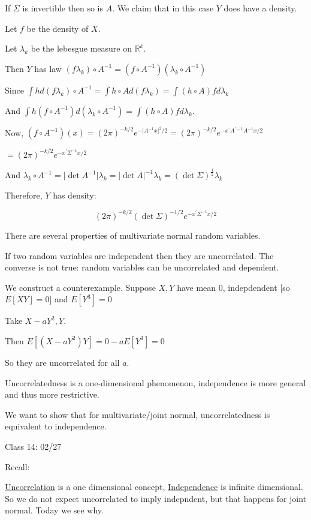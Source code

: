 \documentclass{article}
\theoremstyle{definition}
\begin{document}
If \(\Sigma\) is invertible then so is \(A\). We claim that in this case \(Y\) does have a density.

Let \(f\) be the density of \(X\).

Let \(\lambda_k\) be the lebesgue measure on \(\mathbb{R}^k\).

Then \(Y\) has law \((f \lambda_k)\circ A^{-1} = (f\circ A ^{-1} )(\lambda_k\circ A ^{-1})\) 

Since \(\int h d(f \lambda_k)\circ A ^{-1} = \int h\circ A d(f \lambda _k) = \int (h\circ A)f d \lambda _k\) 

And \(\int h(f\circ A ^{-1} )d(\lambda_k \circ A ^{-1} ) = \int (h\circ A)f d \lambda_k\).

Now, \((f\circ A ^{-1} )(x) = (2 \pi )^{- k / 2}e^{-\vert A ^{-1} x \vert ^2 / 2} = (2\pi )^{- k / 2}e^{- x^{\prime} A^{\prime-1} A ^{-1}  x / 2}\) 

\(= (2\pi )^{-k / 2}e^{- x^{\prime} \Sigma ^{-1} x / 2}\) 

And \(\lambda_k \circ A ^{-1} = \vert \det A ^{-1} \vert  \lambda _k = \vert \det A \vert ^{-1} \lambda_k = (\det \Sigma)^{\frac{1}{2}} \lambda_k\) 

Therefore, \(Y\) has density:

\[
    (2\pi)^{-k / 2}(\det \Sigma)^{-1 / 2}e^{-x^{\prime} \Sigma ^{-1} x / 2}
\]

There are several properties of multivariate normal random variables.

If two random variables are independent then they are uncorrelated. The converse is not true: random variables can be uncorrelated and dependent.

We construct a counterexample. Suppose \(X,Y\) have mean \(0\), indepdendent [so \(E[XY] = 0\)] and \(E[Y^3] = 0\)  

Take \(X - aY^2, Y\). 

Then \(E[(X-aY^2)Y] = 0 - a E[Y^3] = 0\)

So they are uncorrelated for all \(a\).

Uncorrelatedness is a one-dimensional phenomenon, independence is more general and thus more restrictive.

We want to show that for multivariate/joint normal, uncorrelatedness is equivalent to independence.

\hrulefill

Class 14: 02/27

Recall:

\underline{Uncorrelation} is a one dimensional concept, \underline{Independence} is infinite dimensional. So we do not expect uncorrelated to imply indepndent, but that happens for joint normal. Today we see why.
\end{document}
